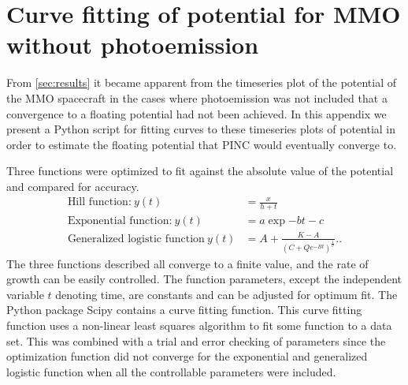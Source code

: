 \chapter{Curve fitting of potential for MMO without photoemission}
\label{sec:appendixC}
\newenvironment{longlisting}{\captionsetup{type=listing}}{}

From \cref{sec:results} it became apparent from the timeseries plot of the potential of the MMO spacecraft in the cases where photoemission was not included that a convergence to a floating potential had not been achieved. In this appendix we present a Python script for fitting curves to these timeseries plots of potential in order to estimate the floating potential that PINC would eventually converge to.

Three functions were optimized to fit against the absolute value of the potential and compared for accuracy.
\begin{subequations}
    \begin{align}
        \text{Hill function:} \: y(t) &= \frac{x}{h + t}\label{eq:Hill} \\
        \text{Exponential function:} \: y(t) &= a \exp{-b t} - c \label{eq:expFit} \\
        \text{Generalized logistic function} \: y(t) &=  A + \frac{K - A}{\left(C + Q e^{-B t}\right)^{\frac{1}{\nu}}}.\label{eq:genLog}.
    \end{align}
\end{subequations}
The three functions described all converge to a finite value, and the rate of growth can be easily controlled. The function parameters, except the independent variable $t$ denoting time, are constants and can be adjusted for optimum fit. The Python package Scipy contains a curve fitting function. This curve fitting function uses a non-linear least squares algorithm to fit some function to a data set. This was combined with a trial and error checking of parameters since the optimization function did not converge for the exponential and generalized logistic function when all the controllable parameters were included. 

